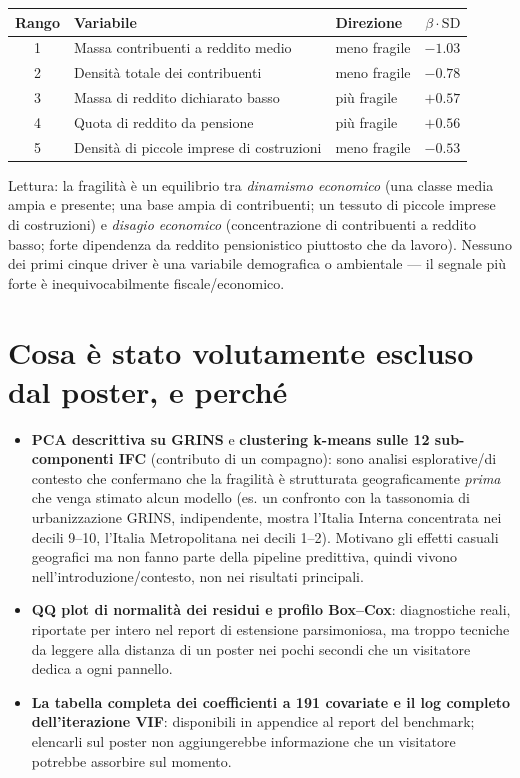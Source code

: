 \documentclass[11pt,a4paper]{article}
\begin{document}
\begin{center}
\begin{tabular}{@{}cllr@{}}
\toprule
Rango & Variabile & Direzione & $\beta \cdot \mathrm{SD}$ \\
\midrule
1 & Massa contribuenti a reddito medio   & meno fragile & $-1.03$ \\
2 & Densità totale dei contribuenti      & meno fragile & $-0.78$ \\
3 & Massa di reddito dichiarato basso    & più fragile  & $+0.57$ \\
4 & Quota di reddito da pensione         & più fragile  & $+0.56$ \\
5 & Densità di piccole imprese di costruzioni & meno fragile & $-0.53$ \\
\bottomrule
\end{tabular}
\end{center}

Lettura: la fragilità è un equilibrio tra \emph{dinamismo
economico} (una classe media ampia e presente; una base ampia di
contribuenti; un tessuto di piccole imprese di costruzioni) e
\emph{disagio economico} (concentrazione di contribuenti a reddito
basso; forte dipendenza da reddito pensionistico piuttosto che da
lavoro). Nessuno dei primi cinque driver è una variabile
demografica o ambientale --- il segnale più forte è inequivocabilmente
fiscale/economico.

\section{Cosa è stato volutamente escluso dal poster, e perché}

\begin{itemize}[leftmargin=2em]
  \item \textbf{PCA descrittiva su GRINS} e \textbf{clustering
  k-means sulle 12 sub-componenti IFC} (contributo di un compagno):
  sono analisi esplorative/di contesto che confermano che la
  fragilità è strutturata geograficamente \emph{prima} che venga
  stimato alcun modello (es. un confronto con la tassonomia di
  urbanizzazione GRINS, indipendente, mostra l'Italia Interna
  concentrata nei decili 9--10, l'Italia Metropolitana nei decili
  1--2). Motivano gli effetti casuali geografici ma non fanno parte
  della pipeline predittiva, quindi vivono nell'introduzione/contesto,
  non nei risultati principali.
  \item \textbf{QQ plot di normalità dei residui e profilo
  Box--Cox}: diagnostiche reali, riportate per intero nel report di
  estensione parsimoniosa, ma troppo tecniche da leggere alla
  distanza di un poster nei pochi secondi che un visitatore dedica a
  ogni pannello.
  \item \textbf{La tabella completa dei coefficienti a 191 covariate
  e il log completo dell'iterazione VIF}: disponibili in appendice al
  report del benchmark; elencarli sul poster non aggiungerebbe
  informazione che un visitatore potrebbe assorbire sul momento.
\end{itemize}
\end{document}
